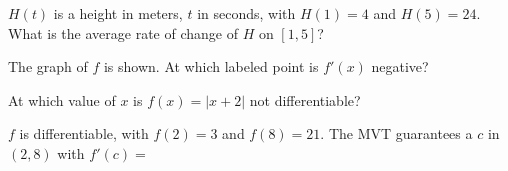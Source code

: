 \begin{exo}{}
$H(t)$ is a height in meters, $t$ in seconds, with $H(1)=4$ and $H(5)=24$. What is the average rate of change of $H$ on $[1,5]$?
\end{exo}
\begin{exo}{}
The graph of $f$ is shown. At which labeled point is $f'(x)$ negative?
\gT
{}
\end{exo}
\begin{exo}{}
At which value of $x$ is $f(x)=|x+2|$ not differentiable?
\end{exo}
\begin{exo}{}
$f$ is differentiable, with $f(2)=3$ and $f(8)=21$. The MVT guarantees a $c$ in $(2,8)$ with $f'(c)=$
\end{exo}
